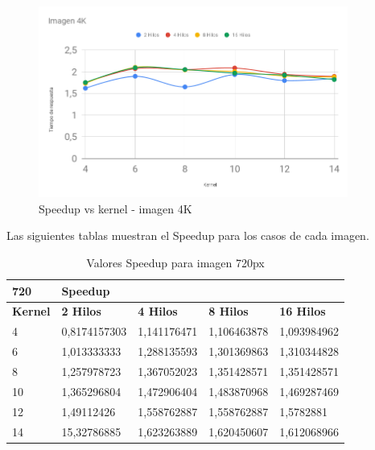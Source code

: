 \documentclass{IEEEtran}
\begin{document}
\begin{figure}[!t]
\centering
\includegraphics[width=4.0in]{imagen-4K.png}
\caption{Speedup vs kernel - imagen 4K }
\label{fig_sim}
\end{figure}

Las siguientes tablas muestran el Speedup para los casos de cada imagen.
\begin{table}[h]
\begin{tabular}{lllll}
\hline
720             & Speedup          &                  &                  &                   \\ \hline
\textbf{Kernel} & \textbf{2 Hilos} & \textbf{4 Hilos} & \textbf{8 Hilos} & \textbf{16 Hilos} \\
4               & 0,8174157303     & 1,141176471      & 1,106463878      & 1,093984962       \\
6               & 1,013333333      & 1,288135593      & 1,301369863      & 1,310344828       \\
8               & 1,257978723      & 1,367052023      & 1,351428571      & 1,351428571       \\
10              & 1,365296804      & 1,472906404      & 1,483870968      & 1,469287469       \\
12              & 1,49112426       & 1,558762887      & 1,558762887      & 1,5782881         \\
14              & 15,32786885      & 1,623263889      & 1,620450607      & 1,612068966       \\ \hline
\end{tabular}
\caption{Valores Speedup para imagen 720px}
\end{table}
\end{document}
